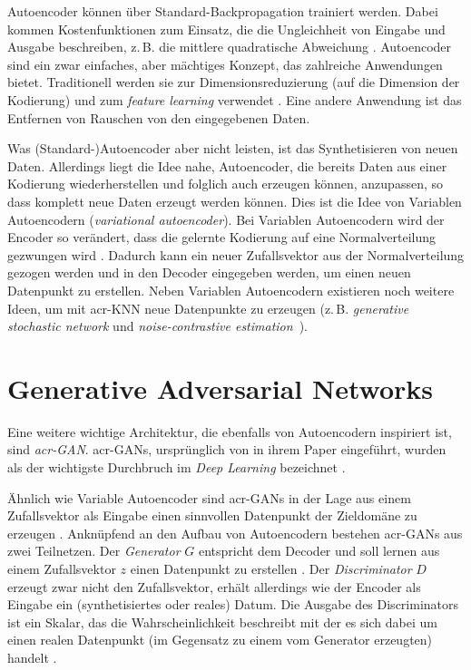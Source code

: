Autoencoder können über Standard-Backpropagation trainiert werden. Dabei kommen
Kostenfunktionen zum Einsatz, die die Ungleichheit von Eingabe und Ausgabe
beschreiben, z.\,B. die mittlere quadratische Abweichung \cite[S.
502f.]{goodfellow2016deep}. Autoencoder sind ein zwar einfaches, aber mächtiges
Konzept, das zahlreiche Anwendungen bietet. Traditionell werden sie zur
Dimensionsreduzierung (auf die Dimension der Kodierung) und zum \emph{feature
learning} verwendet \cite[S. 502]{goodfellow2016deep}. Eine andere Anwendung ist
das Entfernen von Rauschen von den eingegebenen Daten.

Was (Standard-)Autoencoder aber nicht leisten, ist das Synthetisieren von neuen
Daten. Allerdings liegt die Idee nahe, Autoencoder, die bereits Daten aus einer
Kodierung wiederherstellen und folglich auch erzeugen können, anzupassen, so dass
komplett neue Daten erzeugt werden können. Dies ist die Idee von Variablen Autoencodern
(\emph{variational autoencoder}). Bei Variablen Autoencodern wird der Encoder
so verändert, dass die gelernte Kodierung auf eine Normalverteilung gezwungen
wird \cite[S. 653]{raschka2019}. Dadurch kann ein neuer Zufallsvektor aus der
Normalverteilung gezogen werden und in den Decoder eingegeben werden, um einen
neuen Datenpunkt zu erstellen.
Neben Variablen Autoencodern existieren noch weitere Ideen, um mit
\gls{acr-KNN} neue Datenpunkte zu erzeugen (z.\,B. \emph{generative
stochastic network} und
\emph{noise-contrastive estimation}~\cite[S. 2]{goodfellow2014generative}).

\section{Generative Adversarial Networks}\label{GANs}

Eine weitere wichtige Architektur, die ebenfalls von Autoencodern inspiriert ist,
sind \emph{\gls{acr-GAN}}. \gls{acr-GAN}s, ursprünglich \citeyear{goodfellow2014generative} von
\citeauthor{goodfellow2014generative} in ihrem Paper
 eingeführt, wurden als der wichtigste Durchbruch im
\emph{Deep Learning} bezeichnet \cite[S. 619]{raschka2019}.

Ähnlich wie Variable Autoencoder sind \gls{acr-GAN}s in der Lage aus einem Zufallsvektor
als Eingabe einen sinnvollen Datenpunkt der Zieldomäne zu erzeugen \cite[S.
2]{goodfellow2014generative}. Anknüpfend an den Aufbau von Autoencodern bestehen
\gls{acr-GAN}s aus zwei Teilnetzen. Der \emph{Generator} $G$ entspricht dem
Decoder und soll lernen aus einem Zufallsvektor $z$ einen Datenpunkt zu
erstellen \cites[S. 3]{goodfellow2014generative}[S. 623]{raschka2019}. Der
\emph{Discriminator} $D$ erzeugt zwar nicht den Zufallsvektor,
erhält allerdings wie der Encoder als Eingabe ein (synthetisiertes oder reales)
Datum. Die Ausgabe des Discriminators ist ein Skalar, das die
Wahrscheinlichkeit beschreibt 
mit der es sich dabei um einen realen Datenpunkt (im Gegensatz zu einem vom
Generator erzeugten) handelt \cite[S. 1,3]{goodfellow2014generative}.

